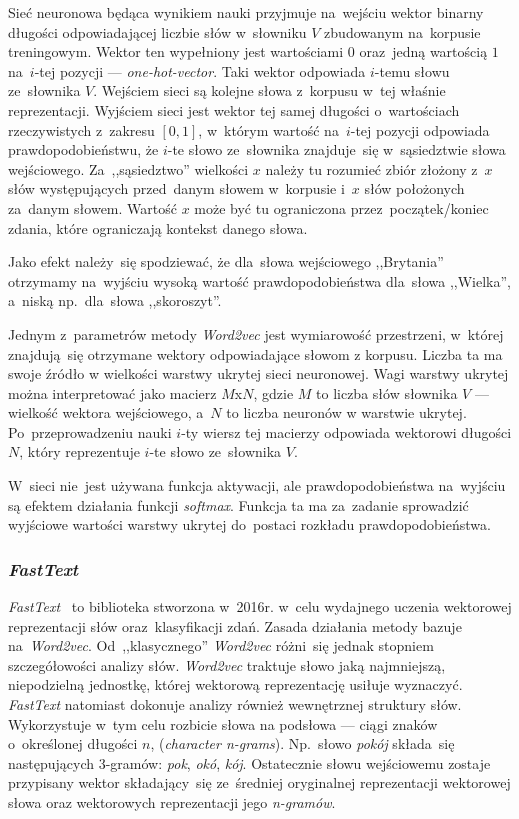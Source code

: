 \documentclass[pl]{minipw} %
\begin{document}
Sieć neuronowa będąca wynikiem nauki przyjmuje na~wejściu wektor binarny długości odpowiadającej liczbie słów w~słowniku $V$ zbudowanym na~korpusie treningowym. Wektor ten wypełniony jest wartościami $0$ oraz~jedną wartością $1$ na~$i$-tej pozycji --- \textit{one-hot-vector}. Taki wektor odpowiada $i$-temu słowu ze~słownika $V$. Wejściem sieci są kolejne słowa z~korpusu w~tej właśnie reprezentacji. Wyjściem sieci jest wektor tej samej długości o~wartościach rzeczywistych z~zakresu $[0,1]$, w~którym wartość na~$i$-tej pozycji odpowiada prawdopodobieństwu, że $i$-te słowo ze~słownika znajduje~się w~sąsiedztwie słowa wejściowego. Za~,,sąsiedztwo'' wielkości $x$ należy tu rozumieć zbiór złożony z~$x$ słów występujących przed~danym słowem w~korpusie i~$x$ słów położonych za~danym słowem. Wartość $x$ może być tu ograniczona przez~początek/koniec zdania, które ograniczają kontekst danego słowa.

Jako efekt należy~się spodziewać, że dla~słowa wejściowego ,,Brytania'' otrzymamy na~wyjściu wysoką wartość prawdopodobieństwa dla~słowa ,,Wielka'', a~niską np.~dla~słowa ,,skoroszyt''.

Jednym z~parametrów metody \textit{Word2vec} jest wymiarowość przestrzeni, w~której znajdują~się otrzymane wektory odpowiadające słowom z korpusu. Liczba ta ma swoje źródło w wielkości warstwy ukrytej sieci neuronowej. Wagi warstwy ukrytej można interpretować jako macierz $M$x$N$, gdzie $M$ to liczba słów słownika $V$ --- wielkość wektora wejściowego, a~$N$ to liczba neuronów w warstwie ukrytej. Po~przeprowadzeniu nauki $i$-ty wiersz tej macierzy odpowiada wektorowi długości $N$, który reprezentuje $i$-te słowo ze~słownika $V$.

W~sieci nie~jest używana funkcja aktywacji, ale prawdopodobieństwa na~wyjściu są efektem działania funkcji \textit{softmax}. Funkcja ta ma za~zadanie sprowadzić wyjściowe wartości warstwy ukrytej do~postaci rozkładu prawdopodobieństwa. 


\subsubsection{\textit{FastText}}

\textit{FastText}~\cite{fasttext} to biblioteka stworzona w~2016r. w~celu wydajnego uczenia wektorowej reprezentacji słów oraz~klasyfikacji zdań. Zasada działania metody bazuje na~\textit{Word2vec}. Od~,,klasycznego'' \textit{Word2vec} różni~się jednak stopniem szczegółowości analizy słów. \textit{Word2vec} traktuje słowo jaką najmniejszą, niepodzielną jednostkę, której wektorową reprezentację usiłuje wyznaczyć. \textit{FastText} natomiast dokonuje analizy również wewnętrznej struktury słów. Wykorzystuje w~tym celu rozbicie słowa na podsłowa --- ciągi znaków o~określonej długości $n$, (\textit{character n-grams}). Np.~słowo \textit{pokój} składa~się następujących 3-gramów: \textit{pok}, \textit{okó}, \textit{kój}. Ostatecznie słowu wejściowemu zostaje przypisany wektor składający~się ze~średniej oryginalnej reprezentacji wektorowej słowa oraz wektorowych reprezentacji jego \textit{n-gramów}.
\end{document}
